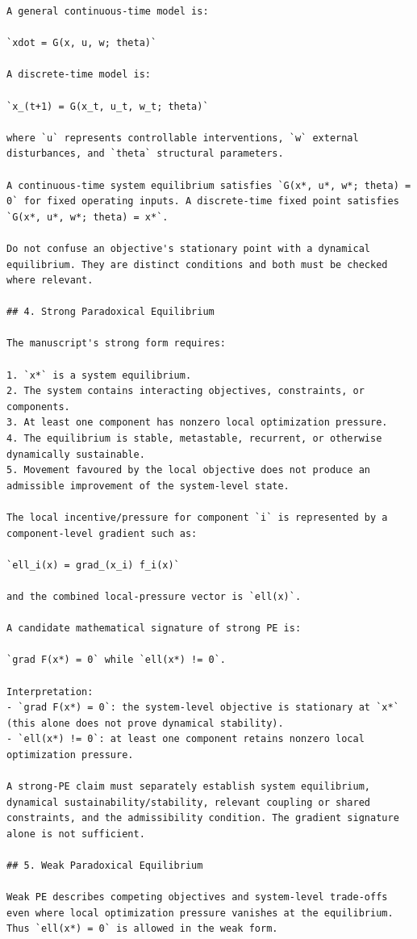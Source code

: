 \documentclass[10pt,a4paper]{article}
\begin{document}
\begin{lstlisting}
A general continuous-time model is:

`xdot = G(x, u, w; theta)`

A discrete-time model is:

`x_(t+1) = G(x_t, u_t, w_t; theta)`

where `u` represents controllable interventions, `w` external disturbances, and `theta` structural parameters.

A continuous-time system equilibrium satisfies `G(x*, u*, w*; theta) = 0` for fixed operating inputs. A discrete-time fixed point satisfies `G(x*, u*, w*; theta) = x*`.

Do not confuse an objective's stationary point with a dynamical equilibrium. They are distinct conditions and both must be checked where relevant.

## 4. Strong Paradoxical Equilibrium

The manuscript's strong form requires:

1. `x*` is a system equilibrium.
2. The system contains interacting objectives, constraints, or components.
3. At least one component has nonzero local optimization pressure.
4. The equilibrium is stable, metastable, recurrent, or otherwise dynamically sustainable.
5. Movement favoured by the local objective does not produce an admissible improvement of the system-level state.

The local incentive/pressure for component `i` is represented by a component-level gradient such as:

`ell_i(x) = grad_(x_i) f_i(x)`

and the combined local-pressure vector is `ell(x)`.

A candidate mathematical signature of strong PE is:

`grad F(x*) = 0` while `ell(x*) != 0`.

Interpretation:
- `grad F(x*) = 0`: the system-level objective is stationary at `x*` (this alone does not prove dynamical stability).
- `ell(x*) != 0`: at least one component retains nonzero local optimization pressure.

A strong-PE claim must separately establish system equilibrium, dynamical sustainability/stability, relevant coupling or shared constraints, and the admissibility condition. The gradient signature alone is not sufficient.

## 5. Weak Paradoxical Equilibrium

Weak PE describes competing objectives and system-level trade-offs even where local optimization pressure vanishes at the equilibrium. Thus `ell(x*) = 0` is allowed in the weak form.


\end{lstlisting}
\end{document}
